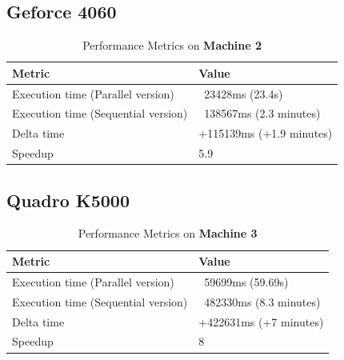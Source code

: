 \subsection{Geforce 4060}

\begin{table}[H]
    \centering
    \begin{tabular}{|l|l|}
    \hline
    \textbf{Metric}                         & \textbf{Value}                       \\ \hline
    Execution time (Parallel version)       & ~23428ms (23.4s)                      \\ \hline
    Execution time (Sequential version)     & ~138567ms (2.3 minutes)               \\ \hline
    Delta time                               & +115139ms (+1.9 minutes)              \\ \hline
    Speedup                                  & 5.9                                    \\ \hline
    \end{tabular}
    \caption{Performance Metrics on \textbf{Machine 2}}
    \label{table:performance_metrics_test4_machine2}
\end{table}


\subsection{Quadro K5000}

\begin{table}[H]
    \centering
    \begin{tabular}{|l|l|}
    \hline
    \textbf{Metric}                         & \textbf{Value}                       \\ \hline
    Execution time (Parallel version)       & ~59699ms (59.69s)                     \\ \hline
    Execution time (Sequential version)     & ~482330ms (8.3 minutes)              \\ \hline
    Delta time                               & +422631ms (+7 minutes)               \\ \hline
    Speedup                                  & 8                                     \\ \hline
    \end{tabular}
    \caption{Performance Metrics on \textbf{Machine 3}}
    \label{table:performance_metrics_test4_machine3}
\end{table}


